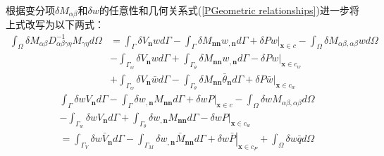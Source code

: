 根据变分项$\delta M_{\alpha\beta}$和$\delta w$的任意性和几何关系式(\ref{PGeometric relationships})进一步将上式改写为以下两式：
\begin{equation}\label{Pweakform1}
    \begin{split}
        \int_\Omega {\delta {M_{\alpha \beta }}D_{\alpha \beta \gamma \eta }^{ - 1}{M_{\gamma \eta }}d\Omega }&=\int_\Gamma  {\delta {V_{\pmb{n}}}wd\Gamma }  - \int_\Gamma  {\delta {M_{{\pmb{nn}}}}{w_{,{\pmb{n}}}}d\Gamma }+{\left. {\delta Pw} \right|_{{\pmb{x}} \in c}} - \int_\Omega  {\delta {M_{\alpha \beta ,\alpha \beta }}wd\Omega } \\
        &-\int_{{\Gamma _w}} {\delta {V_{\pmb{n}}}wd\Gamma }  + \int_{{\Gamma _\theta }} {\delta {M_{{\pmb{nn}}}}{w_{,{\pmb{n}}}}d\Gamma }  - {\left. {\delta Pw} \right|_{{\pmb{x}} \in {c_w}}}\\
        &+\int_{{\Gamma _w}} {\delta {V_{\pmb{n}}}\bar wd\Gamma }  - \int_{{\Gamma _\theta }} {\delta {M_{{\pmb{nn}}}}{{\bar \theta }_{\pmb{n}}}d\Gamma }  + {\left. {\delta P\bar w} \right|_{{\pmb{x}} \in {c_w}}}
    \end{split}
\end{equation}
\begin{equation}
        \begin{split}\label{Pweakform2}
            &\int_\Gamma  {\delta w{V_{\pmb{n}}}d\Gamma } - \int_\Gamma  {\delta {w_{,{\pmb{n}}}}{M_{{\pmb{nn}}}}d\Gamma }  + {\left. {\delta wP} \right|_{{\pmb{x}} \in c}} - \int_\Omega  {\delta w{M_{\alpha \beta ,\alpha\beta}}d\Omega }\\
            &- \int_{{\Gamma _w}} {\delta w{V_{\pmb{n}}}d\Gamma }  + \int_{{\Gamma _\theta }} {\delta {w_{,{\pmb{n}}}}{M_{{\pmb{nn}}}}d\Gamma }  - {\left. {\delta wP} \right|_{{\pmb{x}} \in {c_w}}}\\
            &= \int_{{\Gamma _V}} {\delta w{{\bar V}_{\pmb{n}}}d\Gamma }  - \int_{{\Gamma _M}} {\delta {w_{,{\pmb{n}}}}{{\bar M}_{{\pmb{nn}}}}d\Gamma }  + {\left. {\delta w\bar P} \right|_{{\pmb{x}} \in {c_P}}} + \int_\Omega  {\delta w\bar qd\Omega} 
    \end{split}
\end{equation} 
